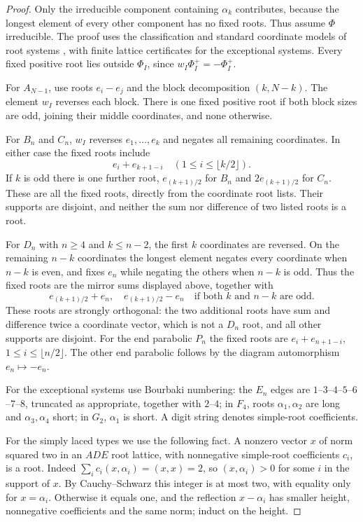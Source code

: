 \documentclass[12pt]{amsart}
\numberwithin{equation}{section}
\theoremstyle{plain}
\theoremstyle{definition}
\theoremstyle{remark}
\begin{document}
\begin{proof}
Only the irreducible component containing $\alpha_k$ contributes, because
the longest element of every other component has no fixed roots. Thus
assume $\Phi$ irreducible. The proof uses the classification and standard
coordinate models of root systems \cite{Humphreys1990}, with finite
lattice certificates for the exceptional systems.
Every fixed positive root lies outside $\Phi_I$, since
$w_I\Phi_I^+=-\Phi_I^+$.

For $A_{N-1}$, use roots $e_i-e_j$ and the block decomposition
$(k,N-k)$. The element $w_I$ reverses each block. There is one fixed
positive root if both block sizes are odd, joining their middle
coordinates, and none otherwise.

For $B_n$ and $C_n$, $w_I$ reverses $e_1,\ldots,e_k$ and negates all
remaining coordinates. In either case the fixed roots include
\[
 e_i+e_{k+1-i}\quad(1\leq i\leq\lfloor k/2\rfloor).
\]
If $k$ is odd there is one further root, $e_{(k+1)/2}$ for $B_n$ and
$2e_{(k+1)/2}$ for $C_n$. These are all the fixed roots, directly from the
coordinate root lists. Their supports are disjoint, and neither the sum
nor difference of two listed roots is a root.

For $D_n$ with $n\geq4$ and $k\leq n-2$, the first $k$ coordinates are reversed.
On the remaining $n-k$ coordinates the longest element negates every
coordinate when $n-k$ is even, and fixes $e_n$ while negating the others
when $n-k$ is odd. Thus the fixed roots are the mirror sums displayed
above, together with
\[
 e_{(k+1)/2}+e_n,\quad e_{(k+1)/2}-e_n
 \quad\text{if both $k$ and $n-k$ are odd}.
\]
These roots are strongly orthogonal: the two additional roots have sum
and difference twice a coordinate vector, which is not a $D_n$ root,
and all other supports are disjoint. For the end parabolic $P_n$ the
fixed roots are $e_i+e_{n+1-i}$, $1\leq i\leq\lfloor n/2\rfloor$.
The other end parabolic follows by the diagram automorphism
$e_n\mapsto-e_n$.

For the exceptional systems use Bourbaki numbering: the $E_n$ edges are
$1$--$3$--$4$--$5$--$6$--$7$--$8$, truncated as appropriate, together
with $2$--$4$; in $F_4$, roots $\alpha_1,\alpha_2$ are long and
$\alpha_3,\alpha_4$ short; in $G_2$, $\alpha_1$ is short. A digit string
denotes simple-root coefficients.

For the simply laced types we use the following fact. A nonzero
vector $x$ of norm squared two in an $ADE$ root lattice, with
nonnegative simple-root coefficients $c_i$, is a root. Indeed
$\sum_ic_i(x,\alpha_i)=(x,x)=2$, so $(x,\alpha_i)>0$ for some $i$ in
the support of $x$. By Cauchy--Schwarz this integer is at most two,
with equality only for $x=\alpha_i$. Otherwise it equals one, and the
reflection $x-\alpha_i$ has smaller height, nonnegative coefficients
and the same norm; induct on the height.


\end{proof}
\end{document}

